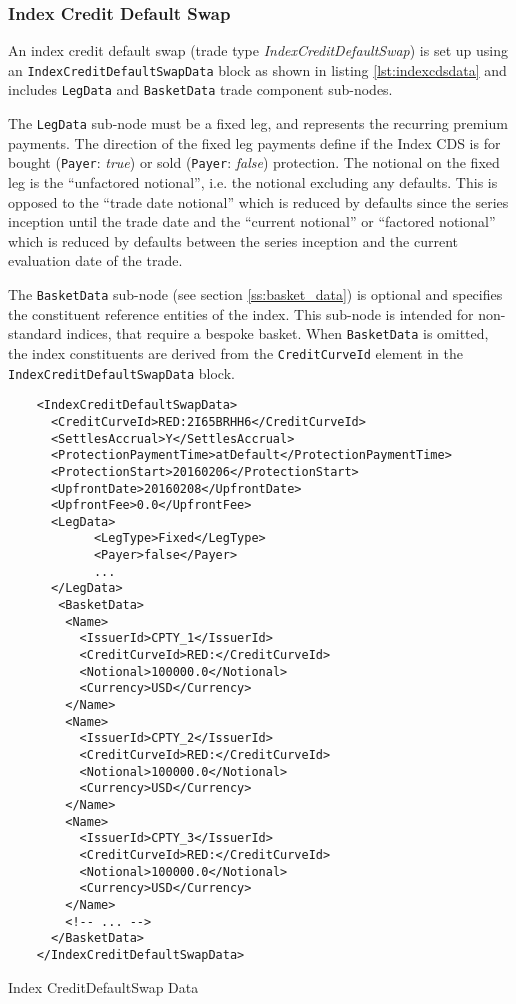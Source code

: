 \subsubsection{Index Credit Default Swap}
\label{ss:indexcds}

An index credit default swap (trade type \emph{IndexCreditDefaultSwap}) is set up using an {\tt IndexCreditDefaultSwapData} block as shown in listing \ref{lst:indexcdsdata} and includes {\tt LegData} and {\tt BasketData} trade component sub-nodes. 

The {\tt LegData} sub-node must be a fixed leg, and  represents the recurring premium payments. The direction of the fixed leg payments define if the Index CDS is for bought (\lstinline!Payer!: \emph{true}) or sold (\lstinline!Payer!: \emph{false}) protection. The notional on the fixed leg is the ``unfactored notional'', i.e. the notional excluding any defaults. This is opposed to the ``trade date notional'' which is reduced by defaults since the series inception until the trade date and the ``current notional'' or ``factored notional'' which is reduced by defaults between the series inception and the current evaluation date of the trade.

The {\tt BasketData} sub-node (see section \ref{ss:basket_data}) is optional and specifies the constituent reference entities of the index. This sub-node is intended for non-standard indices, that require a bespoke basket. When {\tt BasketData} is omitted, the index constituents are derived from the {\tt CreditCurveId} element in the  {\tt IndexCreditDefaultSwapData} block.

\begin{listing}[H]
\begin{verbatim}
    <IndexCreditDefaultSwapData>
      <CreditCurveId>RED:2I65BRHH6</CreditCurveId>
      <SettlesAccrual>Y</SettlesAccrual>
      <ProtectionPaymentTime>atDefault</ProtectionPaymentTime>
      <ProtectionStart>20160206</ProtectionStart>
      <UpfrontDate>20160208</UpfrontDate>
      <UpfrontFee>0.0</UpfrontFee>
      <LegData>
            <LegType>Fixed</LegType>
            <Payer>false</Payer>
            ...
      </LegData>
       <BasketData>
        <Name>
          <IssuerId>CPTY_1</IssuerId>
          <CreditCurveId>RED:</CreditCurveId>
          <Notional>100000.0</Notional>
          <Currency>USD</Currency>
        </Name>
        <Name>
          <IssuerId>CPTY_2</IssuerId>
          <CreditCurveId>RED:</CreditCurveId>
          <Notional>100000.0</Notional>
          <Currency>USD</Currency>
        </Name>
        <Name>
          <IssuerId>CPTY_3</IssuerId>
          <CreditCurveId>RED:</CreditCurveId>
          <Notional>100000.0</Notional>
          <Currency>USD</Currency>
        </Name>
        <!-- ... -->
      </BasketData>
    </IndexCreditDefaultSwapData>
\end{verbatim}
\caption{Index CreditDefaultSwap Data}
\label{lst:indexcdsdata}
\end{listing}

